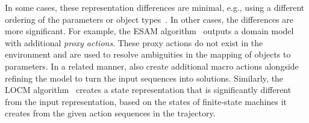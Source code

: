 \documentclass{article}
\theoremstyle{definition}
\theoremstyle{remark}
\newif\ifaddcomments
\newcommand{\roni}[1]{\ifaddcomments{\textcolor{red}{[Roni: #1]}}\fi}
\newcommand{\mauro}[1]{\ifaddcomments{\textcolor{green}{[Mauro: #1]}}\fi}
\newcommand{\yarin}[1]{\ifaddcomments{\textcolor{teal}{[Yarin: #1]}}\fi}
\newcommand{\leo}[1]{\ifaddcomments{\textcolor{pink}{[Leonardo: #1]}}\fi}
\newcommand{\pascalSr}[1]{\ifaddcomments{\textcolor{blue!80!black}{[Pascal B.: {#1}]}}\fi}
\begin{document}
In some cases, these representation differences are minimal, e.g., using a different ordering of the parameters or object types~\cite{xi2024neuro}. %
In other cases, the differences are more significant. 
For example, the ESAM algorithm~\citep{juba2021safe} outputs a domain model with additional \emph{proxy actions}. 
These proxy actions do not exist in the environment and are used to resolve ambiguities in the mapping of objects to parameters.
In a related manner, \cite{Hankui2013RefiningModels} also create additional macro actions alongside refining the model to turn the input sequences into solutions. 
Similarly, the LOCM algorithm~\citep{cresswell2013acquiring} creates a state representation that is significantly different from the input representation, based on the states of finite-state machines it creates from the given action sequences in the trajectory. 
\roni{@All: More examples?}
\mauro{OpMaker2 generates classical planning models in OCL language \cite{mccluskey2010action}}
\roni{@Mauro: I read briefly the OpMaker2 and didn't fully understand. Can you write a sentence or two on this. It was not clear to me if OpMaker2 outputs a PDDL or something else.}
\leo{I did not understand what are the assumptions about the input trajectories representation, if any. For example, do we consider visual trajectories? If yes, what about adding latplan? it uses visual trajectories and learns a classical planning model}
\end{document}
